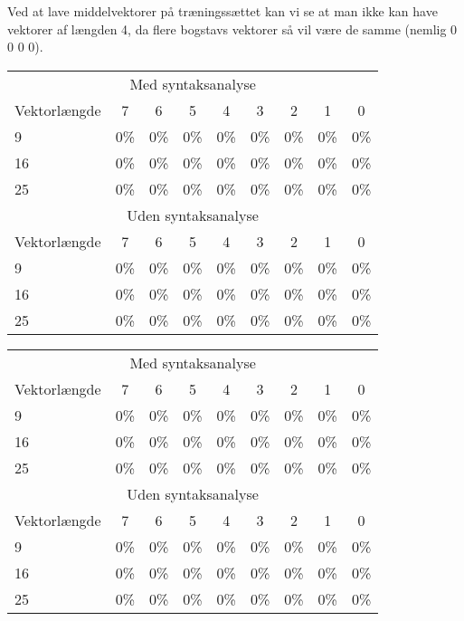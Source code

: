 Ved at lave middelvektorer på træningssættet kan vi se at man ikke kan have vektorer af længden 4, da flere bogstavs vektorer så vil være de samme (nemlig 0 0 0 0).

\begin{tabular}{|l|c|c|c|c|c|c|c|c|}\hline
\rowcolor[gray]{0.9} \multicolumn{9}{|>{\columncolor[gray]{0.9}}c|}{\textbf{Træningssæt}} \\\hline
\multicolumn{9}{|c|}{Med syntaksanalyse}\\\hline
Vektorlængde & 7 & 6 & 5 & 4 & 3 & 2 & 1 & 0\\\hline
9 & 0\% & 0\% & 0\% & 0\% & 0\% & 0\% & 0\% & 0\% \\\hline
16 & 0\% & 0\% & 0\% & 0\% & 0\% & 0\% & 0\% & 0\%\\\hline
25 & 0\% & 0\% & 0\% & 0\% & 0\% & 0\% & 0\% & 0\%\\\hline 
\multicolumn{9}{|c|}{Uden syntaksanalyse}\\\hline
Vektorlængde & 7 & 6 & 5 & 4 & 3 & 2 & 1 & 0\\\hline
9 & 0\% & 0\% & 0\% & 0\% & 0\% & 0\% & 0\% & 0\% \\\hline
16 & 0\% & 0\% & 0\% & 0\% & 0\% & 0\% & 0\% & 0\%\\\hline
25 & 0\% & 0\% & 0\% & 0\% & 0\% & 0\% & 0\% & 0\%\\\hline 
\end{tabular}

\begin{tabular}{|l|c|c|c|c|c|c|c|c|}\hline
\rowcolor[gray]{0.9} \multicolumn{9}{|>{\columncolor[gray]{0.9}}c|}{\textbf{Kontrolsæt}} \\\hline
\multicolumn{9}{|c|}{Med syntaksanalyse}\\\hline
Vektorlængde & 7 & 6 & 5 & 4 & 3 & 2 & 1 & 0\\\hline
9 & 0\% & 0\% & 0\% & 0\% & 0\% & 0\% & 0\% & 0\% \\\hline
16 & 0\% & 0\% & 0\% & 0\% & 0\% & 0\% & 0\% & 0\%\\\hline
25 & 0\% & 0\% & 0\% & 0\% & 0\% & 0\% & 0\% & 0\%\\\hline 
\multicolumn{9}{|c|}{Uden syntaksanalyse}\\\hline
Vektorlængde & 7 & 6 & 5 & 4 & 3 & 2 & 1 & 0\\\hline
9 & 0\% & 0\% & 0\% & 0\% & 0\% & 0\% & 0\% & 0\% \\\hline
16 & 0\% & 0\% & 0\% & 0\% & 0\% & 0\% & 0\% & 0\%\\\hline
25 & 0\% & 0\% & 0\% & 0\% & 0\% & 0\% & 0\% & 0\%\\\hline 
\end{tabular}

